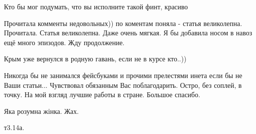 \begin{itemize}
 
Кто бы мог подумать, что вы исполните такой финт, красиво🤝

 
Прочитала комменты недовольных)) по коментам поняла - статья великолепна. Прочитала. Статья великолепна. Даже очень мягкая. Я бы добавила носом в навоз ещё много эпизодов. Жду продолжение.

 
Крым уже вернулся в родную гавань, если не в курсе кто..))

 

Никогда бы не занимался фейсбуками и прочими прелестями инета если бы не Ваши
статьи... Чувствовал обязанным Вас поблагодарить. Остро, без соплей, в точку.
На мой взгляд лучшие работы в стране. Большое спасибо.

 
Яка розумна жінка. Жах.

 
т3.14а.

 

\end{itemize}
